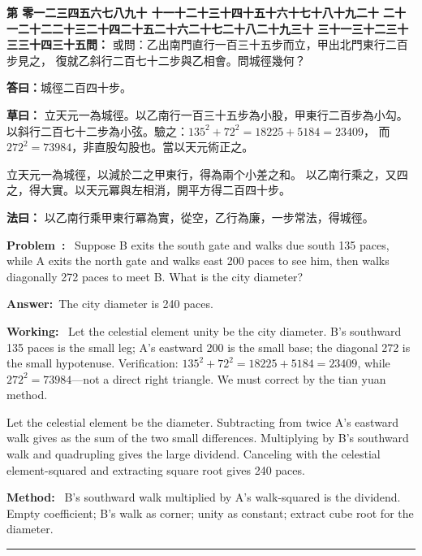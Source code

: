 \documentclass[9pt,a4paper]{article}
\newcounter{probnum}
\newcounter{overallnum}
\newcommand{\chnum}[1]{%
  \ifcase#1 零\or 一\or 二\or 三\or 四\or 五\or 六\or 七\or 八\or 九\or 十\or
    十一\or 十二\or 十三\or 十四\or 十五\or 十六\or 十七\or 十八\or 十九\or 二十\or
    二十一\or 二十二\or 二十三\or 二十四\or 二十五\or 二十六\or 二十七\or 二十八\or 二十九\or 三十\or
    三十一\or 三十二\or 三十三\or 三十四\or 三十五\fi}
\newcommand{\problem}[1]{\stepcounter{probnum}\stepcounter{overallnum}\par\noindent\textbf{\color{volcolor}第\chnum{\value{probnum}}問：}#1\par\vspace{0.15cm}}
\newcommand{\answer}[1]{\par\noindent\textbf{答曰：}#1\par\vspace{0.15cm}}
\newcommand{\working}[1]{\par\noindent\textbf{草曰：}#1\par\vspace{0.15cm}}
\newcommand{\method}[1]{\par\noindent\textbf{法曰：}#1\par\vspace{0.25cm}}
\newcommand{\eproblem}[1]{\par\noindent\textbf{\color{volcolor}Problem~\theoverallnum:}~#1\par\vspace{0.15cm}}
\newcommand{\eanswer}[1]{\par\noindent\textbf{Answer:}~#1\par\vspace{0.15cm}}
\newcommand{\eworking}[1]{\par\noindent\textbf{Working:}~#1\par\vspace{0.15cm}}
\newcommand{\emethod}[1]{\par\noindent\textbf{Method:}~#1\par\vspace{0.25cm}}
\newcommand{\tianyuan}[2]{\raisebox{-0.6ex}{\scriptsize$\begin{array}{c}#1\\\hline #2\end{array}$}}
\begin{document}
\noindent\begin{minipage}[t]{0.48\textwidth}
\problem{
或問：乙出南門直行一百三十五步而立，甲出北門東行二百步見之，
復就乙斜行二百七十二步與乙相會。問城徑幾何？
}

\answer{城徑二百四十步。}

\working{
立天元一為城徑。以乙南行一百三十五步為小股，甲東行二百步為小勾。
以斜行二百七十二步為小弦。驗之：$135^2 + 72^2 = 18225 + 5184 = 23409$，
而 $272^2 = 73984$，非直股勾股也。當以天元術正之。

立天元一為城徑，以減於二之甲東行，得\tianyuan{400}{1}為兩个小差之和。
以乙南行乘之，又四之，得大實。以天元冪與左相消，開平方得二百四十步。
}

\method{
以乙南行乘甲東行冪為實，從空，乙行為廉，一步常法，得城徑。
}
\end{minipage}%
\hfill%
\begin{minipage}[t]{0.50\textwidth}
\eproblem{
Suppose B exits the south gate and walks due south 135 paces, while A exits
the north gate and walks east 200 paces to see him, then walks diagonally
272 paces to meet B. What is the city diameter?
}

\eanswer{The city diameter is 240 paces.}

\eworking{
Let the celestial element unity be the city diameter. B's southward 135 paces
is the small leg; A's eastward 200 is the small base; the diagonal 272 is the
small hypotenuse. Verification: $135^2 + 72^2 = 18225 + 5184 = 23409$,
while $272^2 = 73984$---not a direct right triangle. We must correct by the
tian yuan method.

Let the celestial element be the diameter. Subtracting from twice A's eastward
walk gives \tianyuan{400}{1} as the sum of the two small differences.
Multiplying by B's southward walk and quadrupling gives the large dividend.
Canceling with the celestial element-squared and extracting square root gives
240 paces.
}

\emethod{
B's southward walk multiplied by A's walk-squared is the dividend. Empty
coefficient; B's walk as corner; unity as constant; extract cube root for
the diameter.
}
\end{minipage}
\vspace{0.15cm}

\vspace{0.15cm}
\noindent\rule{\textwidth}{0.2pt}
\vspace{0.15cm}
\end{document}
